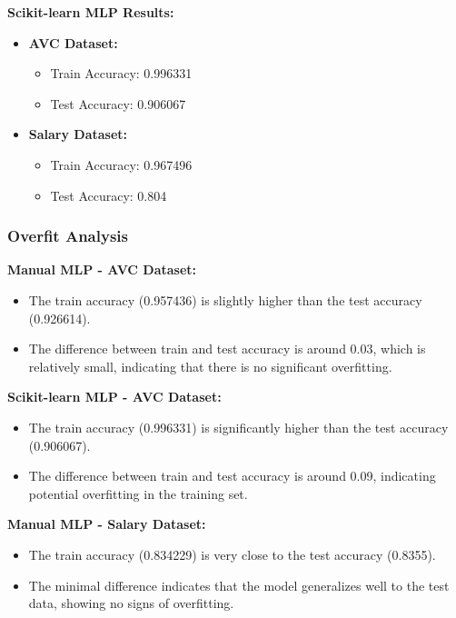 \documentclass[a4paper,12pt]{article}
\begin{document}
\textbf{Scikit-learn MLP Results:}
\begin{itemize}
    \item \textbf{AVC Dataset:}
        \begin{itemize}
            \item Train Accuracy: 0.996331
            \item Test Accuracy: 0.906067
        \end{itemize}
    \item \textbf{Salary Dataset:}
        \begin{itemize}
            \item Train Accuracy: 0.967496
            \item Test Accuracy: 0.804
        \end{itemize}
\end{itemize}

\subsubsection{Overfit Analysis}

\textbf{Manual MLP - AVC Dataset:}
\begin{itemize}
    \item The train accuracy (0.957436) is slightly higher than the test accuracy (0.926614).
    \item The difference between train and test accuracy is around 0.03, which is relatively small, indicating that there is no significant overfitting.
\end{itemize}

\newpage
\textbf{Scikit-learn MLP - AVC Dataset:}
\begin{itemize}
    \item The train accuracy (0.996331) is significantly higher than the test accuracy (0.906067).
    \item The difference between train and test accuracy is around 0.09, indicating potential overfitting in the training set.
\end{itemize}

\textbf{Manual MLP - Salary Dataset:}
\begin{itemize}
    \item The train accuracy (0.834229) is very close to the test accuracy (0.8355).
    \item The minimal difference indicates that the model generalizes well to the test data, showing no signs of overfitting.
\end{itemize}
\end{document}
